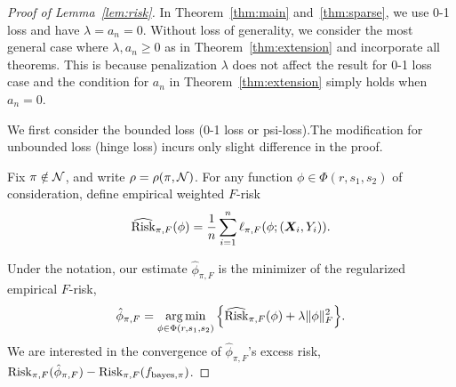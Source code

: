 \documentclass[11pt]{article}
\theoremstyle{plain}
\theoremstyle{definition}
\def\bayespif{f_{\textup{bayes},\pi}}
\def\riskF{\textup{Risk}_{\pi,F}}
\def\eriskF{\widehat{\textup{Risk}}_{\pi,F}}
\begin{document}
\begin{proof}[Proof of Lemma~\ref{lem:risk}]
 In Theorem~\ref{thm:main} and~\ref{thm:sparse}, we use 0-1 loss and have  $\lambda = a_n = 0$.   Without loss of generality, we consider the most general case where  $\lambda,a_n\geq 0$  as in Theorem~\ref{thm:extension} and incorporate all theorems.   This is because penalization $\lambda$ does not affect the result for 0-1 loss case and the condition for $a_n$ in Theorem~\ref{thm:extension} simply holds when $a_n=0$.  
 
 
We first consider the bounded loss (0-1 loss or psi-loss).The modification for unbounded loss (hinge loss) incurs only slight difference in the proof. 

Fix $\pi\notin\mathcal{N}$, and write $\rho=\rho(\pi,\mathcal{N})$. For any function $\phi\in\Phi(r,s_1,s_2)$ of consideration, define empirical weighted $F$-risk
\begin{equation}\label{eq:F}
\eriskF(\phi)	= \frac{1}{n}\sum_{i=1}^n\ell_{\pi,F}(\phi; (\mX_i,Y_i)).
\end{equation}

Under the notation, our estimate $\hat \phi_{\pi,F}$ is the minimizer of the regularized empirical $F$-risk,
\begin{equation}\label{eq:def2}
\hat \phi_{\pi,F}=\argmin_{\phi\in\Phi(r,s_1,s_2)}\Big\{ \eriskF(\phi)+\lambda\FnormSize{}{\phi}^2\Big\}.
\end{equation}
We are interested in the convergence of $\hat \phi_{\pi,F}$'s  excess risk, $\riskF(\hat\phi_{\pi,F})-\riskF(\bayespif)$. 


\end{proof}
\end{document}
